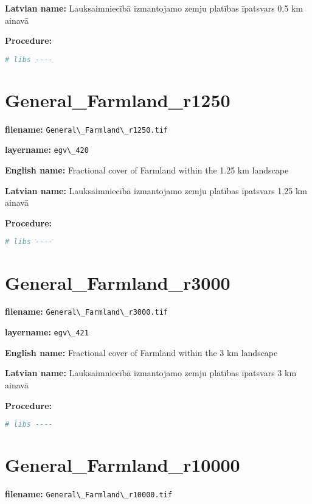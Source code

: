 \documentclass[
]{book}
\newcommand{\passthrough}[1]{#1}
\begin{document}
\textbf{Latvian name:} Lauksaimniecībā izmantojamo zemju platības īpatsvars 0,5 km ainavā

\textbf{Procedure:}

\begin{lstlisting}[language=R]
# libs ----
\end{lstlisting}

\section{General\_Farmland\_r1250}\label{ch06.420}

\textbf{filename:} \passthrough{\lstinline!General\_Farmland\_r1250.tif!}

\textbf{layername:} \passthrough{\lstinline!egv\_420!}

\textbf{English name:} Fractional cover of Farmland within the 1.25 km landscape

\textbf{Latvian name:} Lauksaimniecībā izmantojamo zemju platības īpatsvars 1,25 km ainavā

\textbf{Procedure:}

\begin{lstlisting}[language=R]
# libs ----
\end{lstlisting}

\section{General\_Farmland\_r3000}\label{ch06.421}

\textbf{filename:} \passthrough{\lstinline!General\_Farmland\_r3000.tif!}

\textbf{layername:} \passthrough{\lstinline!egv\_421!}

\textbf{English name:} Fractional cover of Farmland within the 3 km landscape

\textbf{Latvian name:} Lauksaimniecībā izmantojamo zemju platības īpatsvars 3 km ainavā

\textbf{Procedure:}

\begin{lstlisting}[language=R]
# libs ----
\end{lstlisting}

\section{General\_Farmland\_r10000}\label{ch06.422}

\textbf{filename:} \passthrough{\lstinline!General\_Farmland\_r10000.tif!}
\end{document}
